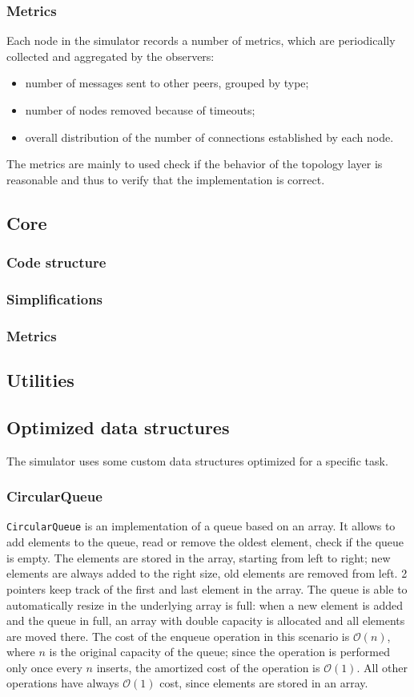\subsubsection{Metrics}
Each node in the simulator records a number of metrics, which are periodically collected and aggregated by the observers:
\begin{itemize}
	\item number of messages sent to other peers, grouped by type;
	\item number of nodes removed because of timeouts;
	\item overall distribution of the number of connections established by each node.
\end{itemize}
The metrics are mainly to used check if the behavior of the topology layer is reasonable and thus to verify that the implementation is correct.

\subsection{Core}
\subsubsection{Code structure}
\subsubsection{Simplifications}
\subsubsection{Metrics}
\subsection{Utilities}

\subsection{Optimized data structures}
The simulator uses some custom data structures optimized for a specific task.

\subsubsection{CircularQueue}
\texttt{CircularQueue} is an implementation of a queue based on an array.
It allows to add elements to the queue, read or remove the oldest element, check if the queue is empty.
The elements are stored in the array, starting from left to right;
new elements are always added to the right size, old elements are removed from left.
\num{2} pointers keep track of the first and last element in the array.
The queue is able to automatically resize in the underlying array is full:
when a new element is added and the queue in full, an array with double capacity is allocated and all elements are moved there.
The cost of the enqueue operation in this scenario is $\mathcal{O}(n)$, where $n$ is the original capacity of the queue;
since the operation is performed only once every $n$ inserts, the amortized cost of the operation is $\mathcal{O}(1)$.
All other operations have always $\mathcal{O}(1)$ cost, since elements are stored in an array.


